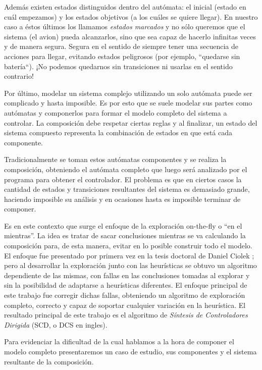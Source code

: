 Además existen estados distinguidos dentro del autómata: el inicial (estado en cuál empezamos) y los estados objetivos (a los cuáles se quiere llegar). En nuestro caso a éstos últimos los llamamos \textit{estados marcados} y no sólo queremos que el sistema (el avion) pueda alcanzarlos, sino que sea capaz de hacerlo infinitas veces y de manera segura. Segura en el sentido de siempre tener una secuencia de acciones para llegar, evitando estados peligrosos (por ejemplo, ``quedarse sin batería``). ¡No podemos quedarnos sin transiciones ni usarlas en el sentido contrario!

Por último, modelar un sistema complejo utilizando un solo autómata puede ser complicado y hasta imposible. Es por esto que se suele modelar sus partes como autómatas y componerlos para formar el modelo completo del sistema a controlar. La composición debe respetar ciertas reglas y al finalizar, un estado del sistema compuesto representa la combinación de estados en que está cada componente.

Tradicionalmente se toman estos autómatas componentes y se realiza la composición, obteniendo el autómata completo que luego será analizado por el programa para obtener el controlador. El problema es que en ciertos casos la cantidad de estados y transiciones resultantes del sistema es demasiado grande, haciendo imposible su análisis y en ocasiones hasta es imposible terminar de componer.

Es en este contexto que surge el enfoque de la exploración on-the-fly o ``en el mientras''. La idea es tratar de sacar conclusiones mientras se va calculando la composición para, de esta manera, evitar en lo posible construir todo el modelo. El enfoque fue presentado por primera vez en la tesis doctoral de Daniel Ciolek \cite{tesisDani}; pero al desarrollar la exploración junto con las heurísticas se obtuvo un algoritmo dependiente de las mismas, con fallas en las conclusiones tomadas al explorar y sin la posibilidad de adaptarse a heurísticas diferentes. El enfoque principal de este trabajo fue corregir dichas fallas, obteniendo un algoritmo de exploración completo, correcto y capaz de soportar cualquier variación en la heurística. El resultado principal de este trabajo es el algoritmo de \textit{Síntesis de Controladores Dirigida} (SCD, o DCS en ingles).

Para evidenciar la dificultad de la cual hablamos a la hora de componer el modelo completo presentaremos un caso de estudio, sus componentes y el sistema resultante de la composición.

